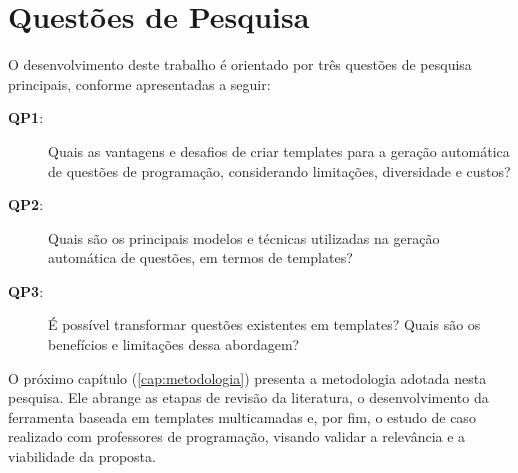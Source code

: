 \section{Questões de Pesquisa}

O desenvolvimento deste trabalho é orientado por três questões de pesquisa principais, conforme apresentadas a seguir:\\

\begin{description}
    \item[\textbf{QP1}:] Quais as vantagens e desafios de criar templates para a geração automática de questões de programação, considerando limitações, diversidade e custos?
    \item[\textbf{QP2}:] Quais são os principais modelos e técnicas utilizadas na geração automática de questões, em termos de templates?
    \item[\textbf{QP3}:] É possível transformar questões existentes em templates? Quais são os benefícios e limitações dessa abordagem?

\end{description}


O próximo capítulo (\autoref{cap:metodologia})  presenta a metodologia adotada nesta pesquisa. Ele abrange as etapas de revisão da literatura, o desenvolvimento da ferramenta baseada em templates multicamadas e, por fim, o estudo de caso realizado com professores de programação, visando validar a relevância e a viabilidade da proposta. 




